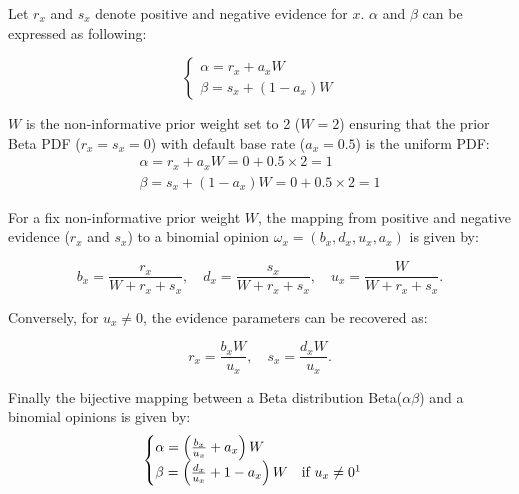 Let $r_x$ and $s_x$ denote positive and negative evidence for $x$. \(\alpha\) and \(\beta\) can be expressed as following:

\begin{equation}
\label{eq:map_r_to_alpha}
\begin{cases}
    \alpha = r_x + a_xW \\ 
    \beta = s_x + (1-a_x)W 
\end{cases}
\end{equation}


\(W\) is the non-informative prior weight set to 2 (\(W=2\)) ensuring that the prior Beta \ac{PDF} (\(r_x = s_x = 0\)) with default base rate (\(a_x=0.5\)) is the uniform \ac{PDF}:
\begin{align}
    \alpha = r_x + a_xW = 0 + 0.5\times2 = 1 \\ \nonumber
    \beta = s_x + (1-a_x)W = 0 + 0.5\times2 = 1
\end{align}



For a fix  non-informative prior weight \(W\), the mapping from positive and negative evidence (\(r_x\) and \(s_x\)) to a binomial opinion 
$\omega_x = (b_x, d_x, u_x, a_x)$ is given by:

\begin{equation}
b_x = \frac{r_x}{W + r_x + s_x}, 
\quad
d_x = \frac{s_x}{W + r_x + s_x},
\quad
u_x = \frac{W}{W + r_x + s_x}.
\label{eq:beta_mapping_forward}
\end{equation}

Conversely, for $u_x \neq 0$, the evidence parameters can be recovered as:

\begin{equation}
r_x = \frac{b_x W}{u_x}, 
\quad
s_x = \frac{d_x W}{u_x}.
\label{eq:beta_mapping_inverse}
\end{equation}

Finally the bijective mapping between a Beta distribution Beta(\(\alpha \beta\)) and a binomial opinions is given by:
\begin{align}
\label{eq:map_b_to_alpha}
\begin{cases}
    \alpha = \left(\frac{b_x}{u_x} + a_x\right)W  \\
    \beta = \left(\frac{d_x}{u_x} + 1 - a_x \right)W \quad \text{if } u_x \neq 0\footnotemark 
\end{cases}
\end{align}

